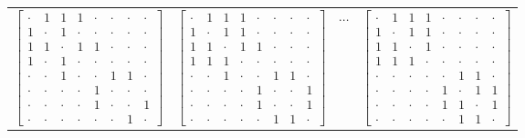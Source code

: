 \documentclass[12pt]{amsbook}
\begin{document}
\begin{figure}[H]
    \centering
        \begin{tabular}{llll}
            $\begin{bmatrix}
                \cdot & 1 & 1 & 1 & \cdot & \cdot & \cdot & \cdot\\
                1 & \cdot & 1 & \cdot & \cdot & \cdot & \cdot & \cdot\\
                1 & 1 & \cdot & 1 & 1 & \cdot & \cdot & \cdot\\
                1 & \cdot & 1 & \cdot & \cdot & \cdot & \cdot & \cdot\\
                \cdot & \cdot & 1 & \cdot & \cdot & 1 & 1 & \cdot\\
                \cdot & \cdot & \cdot & \cdot & 1 & \cdot & \cdot & \cdot\\
                \cdot & \cdot & \cdot & \cdot & 1 & \cdot & \cdot & 1\\
                \cdot & \cdot & \cdot & \cdot & \cdot & \cdot & 1 & \cdot
            \end{bmatrix}$
            &
            $\begin{bmatrix}
                \cdot & 1 & 1 & 1 & \cdot & \cdot & \cdot & \cdot\\
                1 & \cdot & 1 & 1 & \cdot & \cdot & \cdot & \cdot\\
                1 & 1 & \cdot & 1 & 1 & \cdot & \cdot & \cdot\\
                1 & 1 & 1 & \cdot & \cdot & \cdot & \cdot & \cdot\\
                \cdot & \cdot & 1 & \cdot & \cdot & 1 & 1 & \cdot\\
                \cdot & \cdot & \cdot & \cdot & 1 & \cdot & \cdot & 1\\
                \cdot & \cdot & \cdot & \cdot & 1 & \cdot & \cdot & 1\\
                \cdot & \cdot & \cdot & \cdot & \cdot & 1 & 1 & \cdot
            \end{bmatrix}$
            &
            $\cdots$
            &
            $\begin{bmatrix}
                \cdot & 1 & 1 & 1 & \cdot & \cdot & \cdot & \cdot\\
                1 & \cdot & 1 & 1 & \cdot & \cdot & \cdot & \cdot\\
                1 & 1 & \cdot & 1 & \cdot & \cdot & \cdot & \cdot\\
                1 & 1 & 1 & \cdot & \cdot & \cdot & \cdot & \cdot\\
                \cdot & \cdot & \cdot & \cdot & \cdot & 1 & 1 & \cdot\\
                \cdot & \cdot & \cdot & \cdot & 1 & \cdot & 1 & 1\\
                \cdot & \cdot & \cdot & \cdot & 1 & 1 & \cdot & 1\\
                \cdot & \cdot & \cdot & \cdot & \cdot & 1 & 1 & \cdot
            \end{bmatrix}$
            

\end{tabular}
\end{figure}
\end{document}
